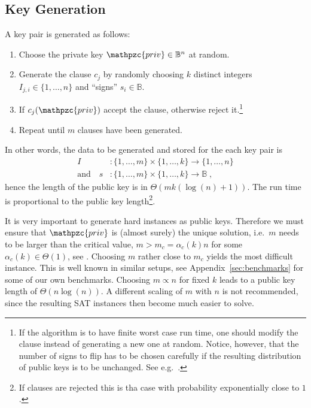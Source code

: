 \documentclass[final,journal,compsoc]{IEEEtran}
\newcommand{\priv}{\mathpzc{priv}}
\begin{document}
\subsection{Key Generation\label{sub:single-keygen}}

A key pair is generated as follows:
\begin{enumerate}
\item Choose the private key $\priv \in \mathbb B^n$ at random.

\item Generate the  clause $c_j$ by randomly choosing $k$
  distinct integers $I_{j,i}\in\{1,\ldots,n\}$ and ``signs'' $s_i \in \mathbb
  B$. 

\item If $c_j(\priv)$ accept the clause, otherwise reject
  it.\footnote{If the algorithm is to have finite worst case run time,
    one should modify the clause instead of generating a new one at
    random. Notice, however, that the number of signs to flip has to
    be chosen carefully if the resulting distribution of public keys
    is to be unchanged. See e.g.~\cite{Krzakala2012}.}

\item Repeat until $m$ clauses have been generated.
\end{enumerate}

In other words, the data to be generated and stored for the each key
pair is
\begin{align}
I&:
\{1,\ldots,m\}\times\{1,\ldots,k\} \to  \{1, \ldots, n\}
\\
\text{and}\quad s &:
\{1,\ldots,m\}\times\{1,\ldots,k\} \to  \mathbb B\;,
\end{align}
hence the length of the public key is in $\Theta(m k (\log(n)+1))$.
The run time is proportional to the public key length\footnote{If
  clauses are rejected this is tha case with probability exponentially
  close to $1$.}.


It is very important to generate hard instances as public
keys. Therefore we must ensure that $\priv$ is (almost surely) the
unique solution, i.e.\ $m$ needs to be larger than the critical value,
$m>m_c=\alpha_c(k) n$ for some $\alpha_c(k)\in\Theta(1)$, see
\cite{Kirkpatrick1994}.  Choosing $m$ rather close to $m_c$ yields the
most difficult instance. This is well known in similar setups, see
Appendix~\ref{sec:benchmarks} for some of our own benchmarks.
Choosing $m \propto n$ for fixed $k$ leads to a public key length of
$\Theta(n\log(n))$. A different scaling of $m$ with $n$ is not
recommended, since the resulting SAT instances then become much easier
to solve.
\end{document}
